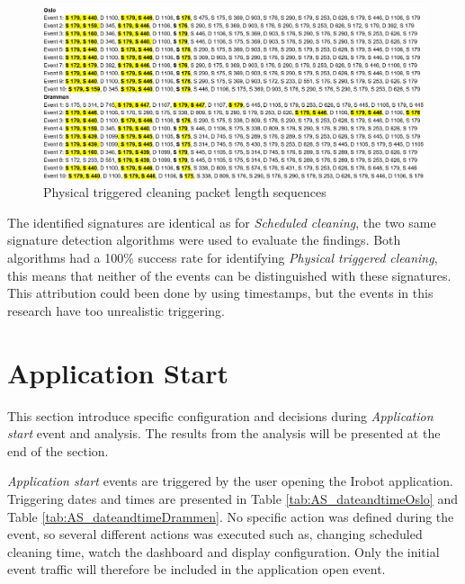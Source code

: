 \begin{figure}[H]
    \centering
    \includegraphics[width=\textwidth]{figures/Sequence_PC.png}
    \caption{Physical triggered cleaning packet length sequences}
    \label{fig:PCseq}
\end{figure}

The identified signatures are identical as for \textit{Scheduled cleaning}, the two same signature detection algorithms were used to evaluate the findings. Both algorithms had a 100\% success rate for identifying \textit{Physical triggered cleaning}, this means that neither of the events can be distinguished with these signatures. This attribution could been done by using timestamps, but the events in this research have too unrealistic triggering. 

\section{Application Start}
This section introduce specific configuration and decisions during \textit{Application start} event and analysis. The results from the analysis will be presented at the end of the section.

\textit{Application start} events are triggered by the user opening the Irobot application. Triggering dates and times are presented in Table \ref{tab:AS_dateandtimeOslo} and Table \ref{tab:AS_dateandtimeDrammen}. No specific action was defined during the event, so several different actions was executed such as, changing scheduled cleaning time, watch the dashboard and display configuration. Only the initial event traffic will therefore be included in the application open event. 

